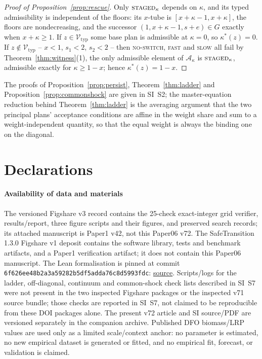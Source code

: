 \documentclass[preprint,11pt,authoryear]{elsarticle}
\theoremstyle{definition}
\theoremstyle{remark}
\newcommand{\Vtyp}{\mathcal{V}_{\mathrm{typ}}}
\newcommand{\act}[1]{\textsc{#1}}
\begin{document}
\begin{proof}[Proof of Proposition~\ref{prop:rescue}]
Only $\act{staged}_\kappa$ depends on $\kappa$, and its typed admissibility is independent of the floors: its $x$-tube is $[x+\kappa-1,x+\kappa]$, the floors are nondecreasing, and the successor $(1,x+\kappa-1,s+e)\in G$ exactly when $x+\kappa\ge1$. If $z\in\Vtyp$ some base plan is admissible at $\kappa=0$, so $\kappa^*(z)=0$. If $z\notin\Vtyp$ -- $x<1$, $s_1<2$, $s_2<2$ -- then \act{no-switch}, \act{fast} and \act{slow} all fail by Theorem~\ref{thm:witness}(1), the only admissible element of $\mathcal A_\kappa$ is $\act{staged}_\kappa$, admissible exactly for $\kappa\ge1-x$; hence $\kappa^*(z)=1-x$.
\end{proof}

\noindent The proofs of Proposition~\ref{prop:persist}, Theorem~\ref{thm:ladder} and Proposition~\ref{prop:commonshock} are given in SI~S2; the master-equation reduction behind Theorem~\ref{thm:ladder} is the averaging argument that the two principal plans' acceptance conditions are affine in the weight share and sum to a weight-independent quantity, so that the equal weight is always the binding one on the diagonal.

\section*{Declarations}
\paragraph{Availability of data and materials} The versioned Figshare v3 record \citep{Abaee2026code} contains the 25-check exact-integer grid verifier, results/report, three figure scripts and their figures, and preserved search records; its attached manuscript is Paper1 v42, not this Paper06 v72. The SafeTransition 1.3.0 Figshare v1 deposit \citep{Abaee2026software} contains the software library, tests and benchmark artifacts, and a Paper1 verification artifact; it does not contain this Paper06 manuscript. The Lean formalisation is pinned at commit \texttt{6f626ee48b2a3a59282b5df5adda76c8d5993fdc}: \href{https://github.com/MIKEAA2020/general-sustainability/blob/6f626ee48b2a3a59282b5df5adda76c8d5993fdc/lean/Formalizations/P1_AssessmentSeparation.lean}{source}. Scripts/logs for the ladder, off-diagonal, continuum and common-shock check lists described in SI~S7 were not present in the two inspected Figshare packages or the inspected v71 source bundle; those checks are reported in SI~S7, not claimed to be reproducible from these DOI packages alone. The present v72 article and SI source/PDF are versioned separately in the companion archive. Published DFO biomass/LRP values are used only as a limited scale/context anchor: no parameter is estimated, no new empirical dataset is generated or fitted, and no empirical fit, forecast, or validation is claimed.
\end{document}

